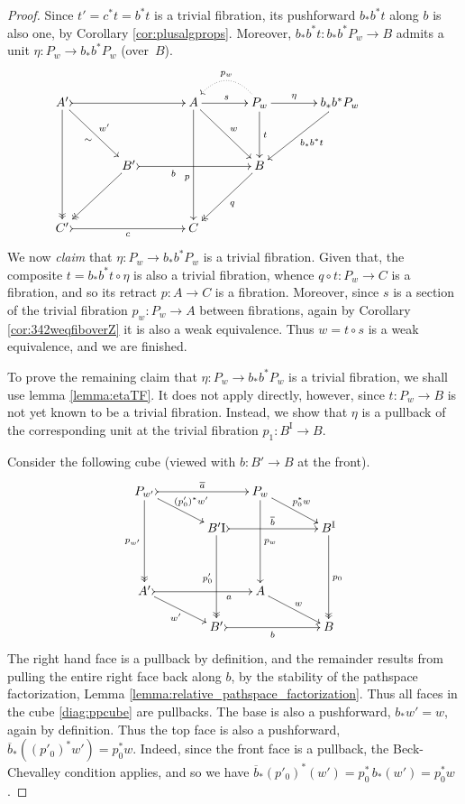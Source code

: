 \documentclass[11pt,reqno]{amsart}
\newcommand{\ra}{\ensuremath{\rightarrow}}
\newcommand{\I}{\ensuremath{\mathrm{I}}}
\theoremstyle{remark}
\theoremstyle{definition}
\begin{document}
\begin{proof}
Since $t' = c^*t = b^*t$ is a trivial fibration, its pushforward $b_*b^*t$ along $b$ is also one, by Corollary \ref{cor:plusalgprops}.  Moreover, $b_*b^*t : b_*b^*P_w \ra B$ admits a unit $\eta : P_w \ra  b_*b^*P_w$ (over~$B$).  
\begin{equation}\label{diag:EEPfactored3}
\xymatrix@=1.5em{
A' \ar@{->>}[dddd] \ar[rrdd]_{\sim}^{w'} \ar@{>->}[rrrr] && && A \ar[dddd]_>>>>>>>>>>>>p \ar[rrdd]^{w} \ar[rr]^s && \ar@{.>}@/_1.5pc/[ll]_{p_w} P_w \ar[dd]^t \ar[rr]^-\eta && b_*b^*P_w \ar[lldd]^{b_*b^*t}\\
\\
&& B' \ar@{->>}[lldd] \ar@{>->}[rrrr]_<<<<<<<<<<b  &&&& B \ar@{->>}[lldd]^q &&&& \\
\\
C' \ar@{>->}[rrrr]_c &&&& C &&&&
}
\end{equation}
We now \emph{claim} that $\eta : P_w \ra  b_*b^*P_w$ is a trivial fibration.  Given that,  the composite $t = b_*b^*t \circ \eta$ is also a trivial fibration, whence $q\circ t : P_w \ra C$ is a fibration, and so its retract $p:A\ra C$ is a fibration.  Moreover, since $s$ is a section of the trivial fibration $p_w: P_w\ra A$ between fibrations, again by Corollary \ref{cor:342weqfiboverZ} it is also a weak equivalence. Thus $w=t\circ s$ is a weak equivalence, and we are finished. 

To prove the remaining claim that $\eta : P_w \ra  b_*b^*P_w$ is a trivial fibration, we shall use lemma \ref{lemma:etaTF}.  It does not apply directly, however, since $t : P_w \ra B$ is not yet known to be a trivial fibration.  Instead, we show that $\eta$ is a pullback of the corresponding unit at the trivial fibration $p_1 : B^\I \ra B$.

Consider the following cube (viewed with $b:B'\ra B$ at the front).
\begin{equation}\label{diag:ppcube}
\xymatrix@=1.5em{
P_{w'} \ar@{->>}[ddd]_{p_{w'}} \ar[rrd]^{(p'_0)^*w'} \ar@{>->}[rrr]^{\overline{a}}
		&&& P_w \ar[ddd]^{p_w} \ar[rrd]^{p_0^*w} &&\\
&& B'^\I \ar@{->>}[ddd]_{p'_0} \ar@{>->}[rrr]^{\overline{b}}  
		&&& B^\I \ar@{->>}[ddd]^{p_0} \\
\\
A' \ar@{>->}[rrr]_>>>>>>>a  \ar[rrd]_{w'}
		&&& A \ar[rrd]^{w} &&\\
&& B'\ar@{>->}[rrr]_b &&& B
}
\end{equation}
The right hand face is a pullback by definition, and the remainder results from pulling the entire right face back along $b$, by the stability of the pathspace factorization, Lemma \ref{lemma:relative_pathspace_factorization}. Thus all faces in the cube \eqref{diag:ppcube}
are pullbacks.  The base is also a pushforward, $b_*w'=w$, again by definition.  Thus the top face is also a pushforward, $\overline{b}_*((p'_0)^*w')=p_0^*w$. Indeed, since the front face is a pullback, the Beck-Chevalley condition applies, and so we have $\overline{b}_*(p'_0)^*(w') = p_0^*\,b_*(w') = p_0^*w$.


\end{proof}
\end{document}

